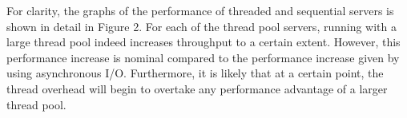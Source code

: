 \documentclass[letterpaper,12pt]{article}
\begin{document}
For clarity, the graphs of the performance of threaded and sequential servers is shown in detail in Figure 2. For each of the thread pool servers, running with a large thread pool indeed increases throughput to a certain extent. However, this performance increase is nominal compared to the performance increase given by using asynchronous I/O. Furthermore, it is likely that at a certain point, the thread overhead will begin to overtake any performance advantage of a larger thread pool. 
\end{document}
